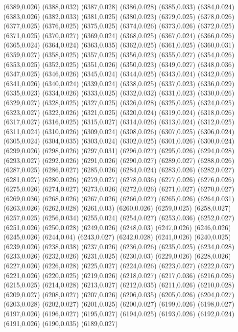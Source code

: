 (6389,0.026)
(6388,0.032)
(6387,0.028)
(6386,0.028)
(6385,0.033)
(6384,0.024)
(6383,0.026)
(6382,0.033)
(6381,0.025)
(6380,0.023)
(6379,0.025)
(6378,0.026)
(6377,0.025)
(6376,0.025)
(6375,0.025)
(6374,0.026)
(6373,0.026)
(6372,0.025)
(6371,0.025)
(6370,0.027)
(6369,0.024)
(6368,0.025)
(6367,0.024)
(6366,0.026)
(6365,0.024)
(6364,0.024)
(6363,0.035)
(6362,0.025)
(6361,0.025)
(6360,0.031)
(6359,0.027)
(6358,0.025)
(6357,0.025)
(6356,0.023)
(6355,0.027)
(6354,0.026)
(6353,0.025)
(6352,0.025)
(6351,0.026)
(6350,0.023)
(6349,0.027)
(6348,0.036)
(6347,0.025)
(6346,0.026)
(6345,0.024)
(6344,0.025)
(6343,0.024)
(6342,0.026)
(6341,0.026)
(6340,0.024)
(6339,0.024)
(6338,0.025)
(6337,0.023)
(6336,0.029)
(6335,0.023)
(6334,0.026)
(6333,0.025)
(6332,0.032)
(6331,0.023)
(6330,0.026)
(6329,0.027)
(6328,0.025)
(6327,0.025)
(6326,0.028)
(6325,0.025)
(6324,0.025)
(6323,0.027)
(6322,0.026)
(6321,0.025)
(6320,0.024)
(6319,0.024)
(6318,0.026)
(6317,0.027)
(6316,0.025)
(6315,0.027)
(6314,0.026)
(6313,0.024)
(6312,0.025)
(6311,0.024)
(6310,0.026)
(6309,0.024)
(6308,0.026)
(6307,0.025)
(6306,0.024)
(6305,0.024)
(6304,0.035)
(6303,0.024)
(6302,0.025)
(6301,0.026)
(6300,0.024)
(6299,0.026)
(6298,0.026)
(6297,0.031)
(6296,0.027)
(6295,0.026)
(6294,0.028)
(6293,0.027)
(6292,0.026)
(6291,0.026)
(6290,0.027)
(6289,0.027)
(6288,0.026)
(6287,0.025)
(6286,0.027)
(6285,0.026)
(6284,0.024)
(6283,0.026)
(6282,0.027)
(6281,0.027)
(6280,0.026)
(6279,0.027)
(6278,0.036)
(6277,0.026)
(6276,0.026)
(6275,0.026)
(6274,0.027)
(6273,0.026)
(6272,0.026)
(6271,0.027)
(6270,0.027)
(6269,0.036)
(6268,0.026)
(6267,0.026)
(6266,0.027)
(6265,0.026)
(6264,0.031)
(6263,0.026)
(6262,0.028)
(6261,0.03)
(6260,0.026)
(6259,0.025)
(6258,0.027)
(6257,0.025)
(6256,0.034)
(6255,0.024)
(6254,0.027)
(6253,0.036)
(6252,0.027)
(6251,0.026)
(6250,0.028)
(6249,0.026)
(6248,0.03)
(6247,0.026)
(6246,0.026)
(6245,0.026)
(6244,0.04)
(6243,0.027)
(6242,0.028)
(6241,0.026)
(6240,0.025)
(6239,0.026)
(6238,0.038)
(6237,0.026)
(6236,0.026)
(6235,0.025)
(6234,0.028)
(6233,0.026)
(6232,0.026)
(6231,0.025)
(6230,0.03)
(6229,0.026)
(6228,0.026)
(6227,0.026)
(6226,0.028)
(6225,0.027)
(6224,0.026)
(6223,0.027)
(6222,0.037)
(6221,0.026)
(6220,0.025)
(6219,0.026)
(6218,0.027)
(6217,0.036)
(6216,0.026)
(6215,0.025)
(6214,0.028)
(6213,0.027)
(6212,0.035)
(6211,0.026)
(6210,0.028)
(6209,0.027)
(6208,0.027)
(6207,0.026)
(6206,0.035)
(6205,0.026)
(6204,0.027)
(6203,0.028)
(6202,0.027)
(6201,0.025)
(6200,0.027)
(6199,0.026)
(6198,0.027)
(6197,0.026)
(6196,0.027)
(6195,0.027)
(6194,0.025)
(6193,0.026)
(6192,0.024)
(6191,0.026)
(6190,0.035)
(6189,0.027)
